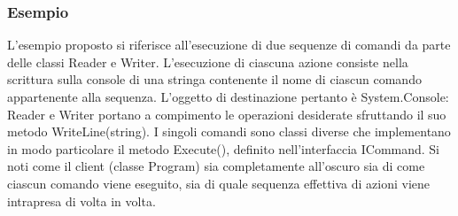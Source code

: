 \documentclass[a4paper,10pt]{article}
\begin{document}
                        \subsubsection{Esempio}
                        L’esempio proposto si riferisce all’esecuzione di due sequenze di comandi da parte delle classi Reader e Writer. L’esecuzione di ciascuna azione consiste nella scrittura sulla console di una stringa contenente il nome di ciascun comando appartenente alla sequenza. L’oggetto di destinazione pertanto è System.Console: Reader e Writer portano a compimento le operazioni desiderate sfruttando il suo metodo WriteLine(string). I singoli comandi sono classi diverse che implementano in modo particolare il metodo Execute(), definito nell’interfaccia ICommand. Si noti come il client (classe Program) sia completamente all’oscuro sia di come ciascun comando viene eseguito, sia di quale sequenza effettiva di azioni viene intrapresa di volta in volta.
\end{document}
